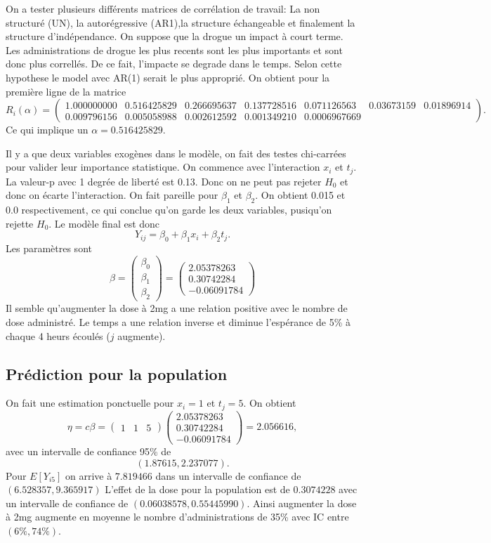 \documentclass{article}
\begin{document}
	On a tester plusieurs différents matrices de corrélation de travail: La non structuré (UN), la autorégressive (AR1),la structure échangeable et finalement la structure d'indépendance. On suppose que la drogue un impact à court terme. Les administrations de drogue les plus recents sont les plus importants et sont donc plus correllés. De ce fait, l'impacte se degrade dans le temps. Selon cette hypothese le model avec AR(1) serait le plus approprié.
	On obtient pour la première ligne de la matrice 
	$$
	R_i(\alpha) = 
	\begin{pmatrix}	
	1.000000000 & 0.516425829 & 0.266695637 & 0.137728516 & 0.071126563 & 0.03673159 & 0.01896914  \\
	0.009796156 & 0.005058988 & 0.002612592 & 0.001349210 & 0.0006967669
	\end{pmatrix}
	.$$
	Ce qui implique un $\alpha = 0.516425829$. 
	
	Il y a que deux variables exogènes dans le modèle, on fait des testes chi-carrées pour valider leur importance statistique. On commence avec l'interaction $x_i$ et $t_j$. La valeur-p avec 1 degrée de liberté est 0.13. Donc on ne peut pas rejeter $H_0$ et donc on écarte l'interaction. On fait pareille pour $\beta_1$ et $\beta_2$. On obtient 0.015 et 0.0 respectivement, ce qui conclue qu'on garde les deux variables, pusiqu'on rejette $H_0$. Le
	modèle final est donc 
	$$Y_{ij} = \beta_0 + \beta_1 x_i + \beta_2 t_j .$$
	Les paramètres sont 
	$$\beta = \begin{pmatrix}
	\beta_0 \\ 
	\beta_1 \\
	\beta_2
	\end{pmatrix}
	 = \begin{pmatrix}
	2.05378263  \\
	0.30742284 \\
	-0.06091784
	\end{pmatrix}$$
	Il semble qu'augmenter la dose à 2mg a une relation positive avec le nombre de dose administré. Le temps a une relation inverse et diminue l'espérance de 5\% à chaque 4 heurs écoulés ($j$ augmente).  
	\subsection{Prédiction pour la population}
	On fait une estimation ponctuelle pour $ x_i = 1$ et $t_j =5$. On obtient 
	$$\eta = c \beta = 
	\begin{pmatrix}
	1 & 1& 5
	\end{pmatrix}
	\begin{pmatrix}
	2.05378263  \\
	0.30742284 \\
	-0.06091784
	\end{pmatrix} = 2.056616,$$
	avec un intervalle de confiance 95\% de
	$$ (1.87615, 2.237077).$$
	Pour $E[Y_{i5}]$ on arrive à $7.819466$ dans un intervalle de confiance de $(6.528357, 9.365917)$
	L'effet de la dose pour la population est de $0.3074228$ avec un intervalle de confiance de $(0.06038578, 0.55445990)$. Ainsi augmenter la dose à 2mg augmente en moyenne le nombre d'administrations de 35\% avec
	IC entre $ (6\%, 74\%).$
	
\end{document}
